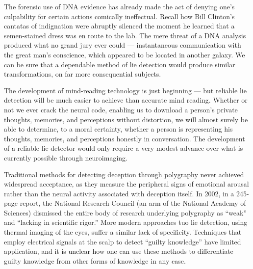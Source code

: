 \documentclass[a4paper,14pt]{extarticle}
\begin{document}
The forensic use of DNA evidence has already made the act of denying one’s culpability for certain actions comically ineffectual.
Recall how Bill Clinton’s cantatas of indignation were abruptly silenced the moment he learned that a semen-stained dress was en route to the lab.
The mere threat of a DNA analysis produced what no grand jury ever could --- instantaneous communication with the great man’s conscience, which appeared to be located in another galaxy.
We can be sure that a dependable method of lie detection would produce similar transformations, on far more consequential subjects.

The development of mind-reading technology is just beginning --- but reliable lie detection will be much easier to achieve than accurate mind reading.
Whether or not we ever crack the neural code, enabling us to download a person’s private thoughts, memories, and perceptions without distortion, we will almost surely be able to determine, to a moral certainty, whether a person is representing his thoughts, memories, and perceptions honestly in conversation.
The development of a reliable lie detector would only require a very modest advance over what is currently possible through neuroimaging.

Traditional methods for detecting deception through polygraphy never achieved widespread acceptance, as they measure the peripheral signs of emotional arousal rather than the neural activity associated with deception itself.
In 2002, in a 245-page report, the National Research Council (an arm of the National Academy of Sciences) dismissed the entire body of research underlying polygraphy as ``weak'' and ``lacking in scientific rigor.''
More modern approaches tuo lie detection, using thermal imaging of the eyes, suffer a similar lack of specificity.
Techniques that employ electrical signals at the scalp to detect ``guilty knowledge'' have limited application, and it is unclear how one can use these methods to differentiate guilty knowledge from other forms of knowledge in any case.
\end{document}
